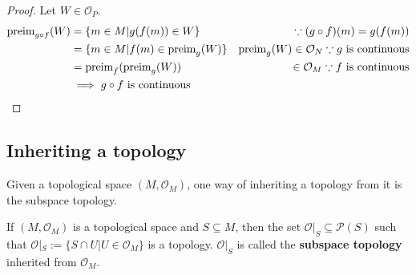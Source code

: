 \begin{proof}
Let $W \in \mathcal{O}_{P}$. \begin{align*}
\text{preim}_{g \circ f}(W) &= \lbrace m \in M | g(f(m)) \in W \rbrace &\because (g \circ f)(m) = g(f(m)) \\
&= \lbrace m \in M | f(m) \in \text{preim}_{g}(W) \rbrace & \text{preim}_{g}(W) \in \mathcal{O}_{N} \because g \text{ is continuous} \\
&= \text{preim}_{f}(\text{preim}_{g}(W)) &\in \mathcal{O}_{M} \because f \text{ is continuous} \\
&\implies g \circ f \text{ is continuous}
\end{align*}
\end{proof}

\subsection{Inheriting a topology}
Given a topological space $(M, \mathcal{O}_{M})$, one way of inheriting a topology from it is the subspace topology.

\begin{theorem}
If $(M, \mathcal{O}_{M})$ is a topological space and $S \subseteq M$, then the set $\mathcal{O}|_S \subseteq \mathcal{P}(S)$ such that $\mathcal{O}|_S := \lbrace S \cap U | U \in \mathcal{O}_{M} \rbrace$ is a topology. $\mathcal{O}|_S$ is called the \textbf{subspace topology} inherited from $\mathcal{O}_{M}$.
\end{theorem}

